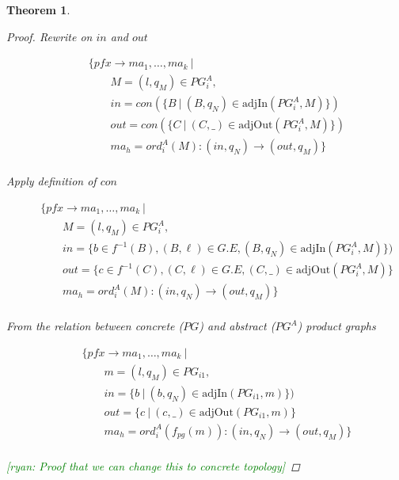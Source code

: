 \documentclass[twocolumn]{sig-alternate-10pt}
\newcommand{\ryan}[1]{\textcolor{green}{[ryan: #1]}}
\newtheorem{thm}{Theorem}[section]
\begin{document}
\begin{thm}
\begin{proof}
  Rewrite on $in$ and $out$

  \[ \begin{array}{l}
     ~~~~~~~~~ \{ pfx \rightarrow ma_1, \dots, ma_k ~\vert~ \\
     ~~~~~~~~~~~~~~~~~~ M = (l,q_M) \in PG^A_i, \\
     ~~~~~~~~~~~~~~~~~~ in = con(\{ B ~\vert~ (B,q_N) \in \text{adjIn}(PG^A_i,M) \}) \\
     ~~~~~~~~~~~~~~~~~~ out = con(\{ C ~\vert~ (C,\_) \in \text{adjOut}(PG^A_i,M) \}) \\
     ~~~~~~~~~~~~~~~~~~ ma_h = ord^A_i(M) : (in,q_N) \rightarrow (out,q_M) \} \\
  \end{array} \]%

  Apply definition of $con$

  \[ \begin{array}{l}
     ~~~~~~~~~ \{ pfx \rightarrow ma_1, \dots, ma_k ~\vert~ \\
     ~~~~~~~~~~~~~~~~~~ M = (l,q_M) \in PG^A_i, \\
     ~~~~~~~~~~~~~~~~~~ in = \{ b \in f^{-1}(B), (B,\ell) \in G.E, (B,q_N) \in \text{adjIn}(PG^A_i,M) \}) \\
     ~~~~~~~~~~~~~~~~~~ out = \{ c \in f^{-1}(C), (C,\ell) \in G.E, (C,\_) \in \text{adjOut}(PG^A_i,M) \} \\
     ~~~~~~~~~~~~~~~~~~ ma_h = ord^A_i(M) : (in,q_N) \rightarrow (out,q_M) \} \\
  \end{array} \]%

  From the relation between concrete ($PG$) and abstract ($PG^A$) product graphs

  \[ \begin{array}{l}
     ~~~~~~~~~ \{ pfx \rightarrow ma_1, \dots, ma_k ~\vert~ \\
     ~~~~~~~~~~~~~~~~~~ m = (l,q_M) \in PG_{i1}, \\
     ~~~~~~~~~~~~~~~~~~ in = \{ b ~\vert~ (b,q_N) \in \text{adjIn}(PG_{i1},m) \}) \\
     ~~~~~~~~~~~~~~~~~~ out = \{ c ~\vert~ (c,\_) \in \text{adjOut}(PG_{i1},m) \} \\
     ~~~~~~~~~~~~~~~~~~ ma_h = ord^A_i(f_{pg}(m)) : (in,q_N) \rightarrow (out,q_M) \} \\
  \end{array} \]%

  \ryan {Proof that we can change this to concrete topology}


\end{proof}
\end{thm}
\end{document}
